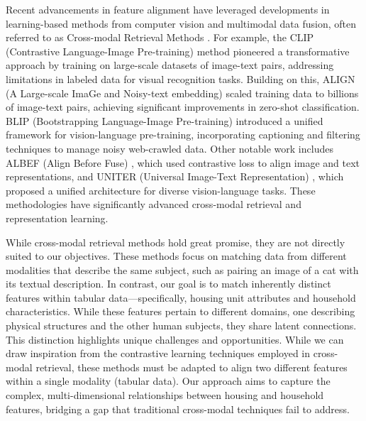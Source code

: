 Recent advancements in feature alignment have leveraged developments in learning-based methods from computer vision and multimodal data fusion, often referred to as Cross-modal Retrieval Methods \cite{cao2022image}. For example, the CLIP (Contrastive Language-Image Pre-training) method \cite{radford2021learning} pioneered a transformative approach by training on large-scale datasets of image-text pairs, addressing limitations in labeled data for visual recognition tasks. Building on this, ALIGN (A Large-scale ImaGe and Noisy-text embedding) \cite{jia2021scaling} scaled training data to billions of image-text pairs, achieving significant improvements in zero-shot classification. BLIP (Bootstrapping Language-Image Pre-training) \cite{li2022blip} introduced a unified framework for vision-language pre-training, incorporating captioning and filtering techniques to manage noisy web-crawled data. Other notable work includes ALBEF (Align Before Fuse) \cite{li2021align}, which used contrastive loss to align image and text representations, and UNITER (Universal Image-Text Representation) \cite{chen2020uniter}, which proposed a unified architecture for diverse vision-language tasks. These methodologies have significantly advanced cross-modal retrieval and representation learning. 

While cross-modal retrieval methods hold great promise, they are not directly suited to our objectives. These methods focus on matching data from different modalities that describe the same subject, such as pairing an image of a cat with its textual description. In contrast, our goal is to match inherently distinct features within tabular data—specifically, housing unit attributes and household characteristics. While these features pertain to different domains, one describing physical structures and the other human subjects, they share latent connections. This distinction highlights unique challenges and opportunities. While we can draw inspiration from the contrastive learning techniques employed in cross-modal retrieval, these methods must be adapted to align two different features within a single modality (tabular data). Our approach aims to capture the complex, multi-dimensional relationships between housing and household features, bridging a gap that traditional cross-modal techniques fail to address.

